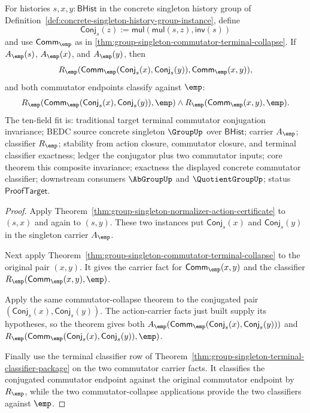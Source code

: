 \begin{theorem}
\label{thm:group-singleton-conjugated-commutator-invariance}
For histories $s,x,y:\mathsf{BHist}$ in the concrete singleton history group of
Definition~\ref{def:concrete-singleton-history-group-instance}, define
$$
\mathsf{Conj}_s(z):=\mathsf{mul}(\mathsf{mul}(s,z),\mathsf{inv}(s))
$$
and use $\mathsf{Comm}_{\emp}$ as in
\autoref{thm:group-singleton-commutator-terminal-collapse}. If
$A_{\emp}(s)$, $A_{\emp}(x)$, and $A_{\emp}(y)$, then
$$
R_{\emp}(\mathsf{Comm}_{\emp}(\mathsf{Conj}_s(x),\mathsf{Conj}_s(y)),
\mathsf{Comm}_{\emp}(x,y)),
$$
and both commutator endpoints classify against $\emp$:
$$
R_{\emp}(\mathsf{Comm}_{\emp}(\mathsf{Conj}_s(x),\mathsf{Conj}_s(y)),\emp)
\land R_{\emp}(\mathsf{Comm}_{\emp}(x,y),\emp).
$$
The ten-field fit is: traditional target terminal commutator conjugation
invariance; BEDC source concrete singleton $\GroupUp$ over $\mathsf{BHist}$;
carrier $A_{\emp}$; classifier $R_{\emp}$; stability from action closure,
commutator closure, and terminal classifier exactness; ledger the conjugator
plus two commutator inputs; core theorem this composite invariance; exactness
the displayed concrete commutator classifier; downstream consumers $\AbGroupUp$
and $\QuotientGroupUp$; status $\mathsf{ProofTarget}$.
\end{theorem}
\begin{proof}
Apply Theorem~\ref{thm:group-singleton-normalizer-action-certificate} to
$(s,x)$ and again to $(s,y)$. These two instances put
$\mathsf{Conj}_s(x)$ and $\mathsf{Conj}_s(y)$ in the singleton carrier
$A_{\emp}$.

Next apply Theorem~\ref{thm:group-singleton-commutator-terminal-collapse} to
the original pair $(x,y)$. It gives the carrier fact for
$\mathsf{Comm}_{\emp}(x,y)$ and the classifier
$R_{\emp}(\mathsf{Comm}_{\emp}(x,y),\emp)$.

Apply the same commutator-collapse theorem to the conjugated pair
$(\mathsf{Conj}_s(x),\mathsf{Conj}_s(y))$. The action-carrier facts just built
supply its hypotheses, so the theorem gives both
$A_{\emp}(\mathsf{Comm}_{\emp}(\mathsf{Conj}_s(x),\mathsf{Conj}_s(y)))$ and
$R_{\emp}(\mathsf{Comm}_{\emp}(\mathsf{Conj}_s(x),\mathsf{Conj}_s(y)),\emp)$.

Finally use the terminal classifier row of
Theorem~\ref{thm:group-singleton-terminal-classifier-package} on the two
commutator carrier facts. It classifies the conjugated commutator endpoint
against the original commutator endpoint by $R_{\emp}$, while the two
commutator-collapse applications provide the two classifiers against $\emp$.
\end{proof}
